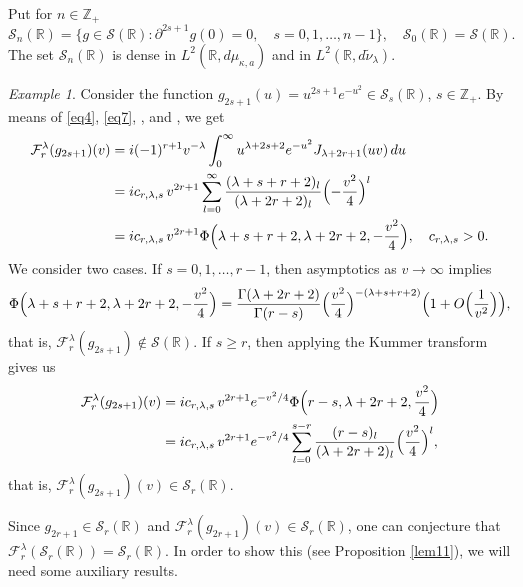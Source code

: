 \documentclass[12pt,twoside,reqno]{amsart}\usepackage[cp1251]{inputenc}
\theoremstyle{plain}
\theoremstyle{remark}
\newtheorem{example}[theorem]{Example}
\begin{document}
Put for $n\in\mathbb{Z}_+$
\[
\mathcal{S}_{n}(\mathbb{R})=\{g\in\mathcal{S}(\mathbb{R})\colon \partial^{2s+1}g(0)=0,\quad s=0,1,\dots,n-1\},\quad \mathcal{S}_{0}(\mathbb{R})=\mathcal{S}(\mathbb{R}).
\]
The set  $\mathcal{S}_{n}(\mathbb{R})$ is dense in $L^{2}(\mathbb{R},d\mu_{\kappa,a})$ and in  $L^{2}(\mathbb{R},d\widetilde{\nu}_{\lambda})$.


\begin{example}%
Consider the function
$g_{2s+1}(u)=u^{2s+1}e^{-u^2}\in\mathcal{S}_{s}(\mathbb{R})$,
$s\in\mathbb{Z}_+$. By means of \eqref{eq4}, \eqref{eq7}, \cite[Chap.~VIII, 8.6(14)]{Ba54},
and \cite[Chap.~VI, 6.1]{BE53a}, we get
\begin{align*}
\mathcal{F}_{r}^{\lambda}(g_{2s+1})(v)&=i(-1)^{r+1}v^{-\lambda}\int_{0}^{\infty}u^{\lambda+2s+2}e^{-u^2}J_{\lambda+2r+1}(uv)\,du\\
&=ic_{r,\lambda,s}\,v^{2r+1}\sum_{l=0}^{\infty}\frac{(\lambda+s+r+2)_l}{(\lambda+2r+2)_l}\Bigl(-\frac{v^2}{4}\Bigr)^{l}\\
&=ic_{r,\lambda,s}\,v^{2r+1}\Phi\Bigl(\lambda+s+r+2,\lambda+2r+2,-\frac{v^2}{4}\Bigr),\quad c_{r,\lambda,s}>0.
\end{align*}
We consider two cases. If $s=0,1,\dots,r-1$, then asymptotics as
$v\to\infty$ \cite[Chap.~VI,6.13.1]{BE53} implies
\[
\Phi\Bigl(\lambda+s+r+2,\lambda+2r+2,-\frac{v^2}{4}\Bigr)=\frac{\Gamma(\lambda+2r+2)}
{\Gamma(r-s)}\Bigl(\frac{v^2}{4}\Bigr)^{-(\lambda+s+r+2)}\Bigl(1+O\Bigl(\frac{1}{v^2}\Bigr)\Bigr),
\]
that is, $\mathcal{F}_{r}^{\lambda}(g_{2s+1})\notin\mathcal{S}(\mathbb{R})$.
If $s\ge r$, then applying the Kummer transform \cite[Chap.~VI,6.3.7)]{BE53} gives us
\begin{align}\label{eq31}
\mathcal{F}_{r}^{\lambda}(g_{2s+1})(v)&=ic_{r,\lambda,s}\,v^{2r+1}e^{-v^2/4}\Phi\Bigl(r-s,\lambda+2r+2,\frac{v^2}{4}\Bigr)\nonumber
\\
&=ic_{r,\lambda,s}\,v^{2r+1}e^{-v^2/4}
\sum_{l=0}^{s-r}\frac{(r-s)_l}{(\lambda+2r+2)_l}\Bigl(\frac{v^2}{4}\Bigr)^{l},
\end{align}
that is,
$\mathcal{F}_{r}^{\lambda}(g_{2s+1})(v)\in \mathcal{S}_{r}(\mathbb{R})$.
\end{example}



Since $g_{2r+1}\in \mathcal{S}_{r}(\mathbb{R})$ and $\mathcal{F}_{r}^{\lambda}(g_{2r+1})(v)\in \mathcal{S}_{r}(\mathbb{R})$,
one can conjecture that %
$\mathcal{F}_{r}^{\lambda}(\mathcal{S}_{r}(\mathbb{R}))=
\mathcal{S}_{r}(\mathbb{R})$.
In order to show this (see Proposition \ref{lem11}), we will need some auxiliary results.
\end{document}
